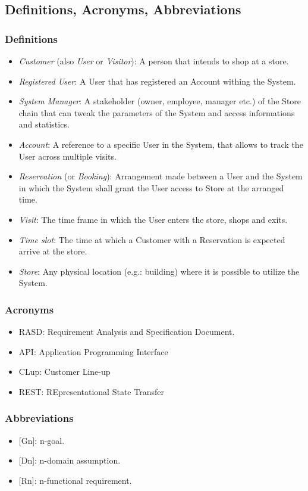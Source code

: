\subsection{Definitions, Acronyms, Abbreviations}

\subsubsection{Definitions}
\begin{itemize}
    \item \emph{Customer} (also \emph{User} or \emph{Visitor}): A person that intends to shop at a store.
    \item \emph{Registered User}: A User that has registered an Account withing the System.
    \item \emph{System Manager}: A stakeholder (owner, employee, manager etc.) of the Store chain that can tweak the parameters of the System and access informations and statistics.
    \item \emph{Account}: A reference to a specific User in the System, that allows to track the User across multiple visits.
    \item \emph{Reservation} (or \emph{Booking}): Arrangement made between a User and the System in which the System shall grant the User access to Store at the arranged time.
    \item \emph{Visit}: The time frame in which the User enters the store, shops and exits.
    \item \emph{Time slot}: The time at which a Customer with a Reservation is expected arrive at the store.
    \item \emph{Store}: Any physical location (e.g.: building) where it is possible to utilize the System.
\end{itemize}

\subsubsection{Acronyms}
\begin{itemize}
    \item RASD: Requirement Analysis and Specification Document.
    \item API: Application Programming Interface
    \item CLup: Customer Line-up
    \item REST: REpresentational State Transfer
\end{itemize}


\subsubsection{Abbreviations}
\begin{itemize}
    \item {[Gn]}: n-goal.
    \item {[Dn]}: n-domain assumption.
    \item {[Rn]}: n-functional requirement.
\end{itemize}

